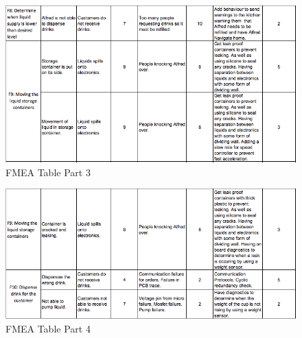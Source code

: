 \documentclass [10pt]{article}
\begin{document}
\begin{figure} [h!]
	\centering
	\includegraphics [scale = 0.7] {figures/FMEA_3.png}
	\caption{FMEA Table Part 3}
\end{figure}

\begin{figure} [h!]
	\centering
	\includegraphics [scale = 0.7] {figures/FMEA_4.png}
	\caption{FMEA Table Part 4}
\end{figure}
\end{document}
